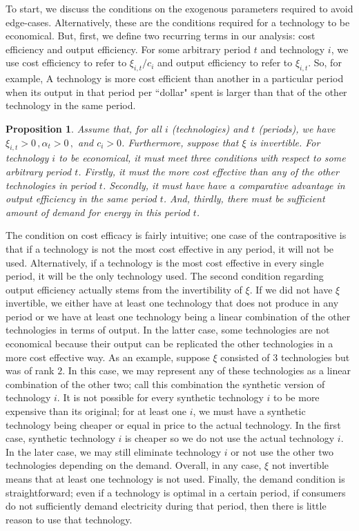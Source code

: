 \documentclass[11pt,a4paper]{extarticle}
\newtheorem{proposition}{Proposition}
\begin{document}
To start, we discuss the conditions on the exogenous parameters required to avoid edge-cases. Alternatively, these are the conditions required for a technology to be economical. But, first, we define two recurring terms in our analysis: cost efficiency and output efficiency. For some arbitrary period $t$ and technology $i$, we use cost efficiency to refer to $\xi_{i,t}/c_i$ and output efficiency to refer to $\xi_{i,t}$. So, for example, A technology is more cost efficient than another in a particular period when its output in that period per ``dollar" spent is larger than that of the other technology in the same period. 
\begin{proposition}
	Assume that, for all  $i$ (technologies) and  $t$ (periods), we have $\xi_{i,t} > 0 \, , \alpha_t > 0 \, ,$ and $ c_i > 0$. Furthermore, suppose that $\xi$ is invertible. For technology $i$ to be economical, it must meet three conditions with respect to some arbitrary period $t$. Firstly, it must the more cost effective than any of the other technologies in period $t$. Secondly, it must have have a comparative advantage in output efficiency in the same period $t$. And, thirdly, there must be sufficient amount of demand for energy in this period $t$. 
\end{proposition}
The condition on cost efficacy is fairly intuitive; one case of the contrapositive is that if a technology is not the most cost effective in any period, it will not be used. Alternatively, if a technology is the most cost effective in every single period, it will be the only technology used. The second condition regarding output efficiency actually stems from the invertibility of $\xi$. If we did not have $\xi$ invertible, we either have at least one technology that does not produce in any period or we have at least one technology being a linear combination of the other technologies in terms of output. In the latter case, some technologies are not economical because their output can be replicated the other technologies in a more cost effective way. As an example, suppose $\xi$ consisted of 3 technologies but was of rank $2$. In this case, we may represent any of these technologies as a linear combination of the other two; call this combination the synthetic version of technology $i$. It is not possible for every synthetic technology $i$ to be more expensive than its original; for at least one $i$, we must have a synthetic technology being cheaper or equal in price to the actual technology. In the first case, synthetic technology $i$ is cheaper so we do not use the actual technology $i$. In the later case, we may still eliminate technology $i$ or not use the other two technologies depending on the demand. Overall, in any case, $\xi$ not invertible means that at least one technology is not used. Finally, the demand condition is straightforward; even if a technology is optimal in a certain period, if consumers do not sufficiently demand electricity during that period, then there is little reason to use that technology. 
\end{document}
